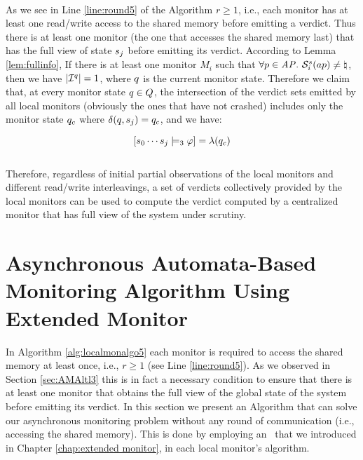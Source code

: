  \ \ 



As we see in Line \ref{line:round5} of the Algorithm $r \geqslant 1$, i.e., each monitor has at least one read/write access to the shared memory before emitting a verdict. Thus there is at least one monitor (the one that accesses the shared memory last) that has the full view of state $s_j$ before emitting its verdict. According to Lemma \ref{lem:fullinfo}, If there is at least one monitor $M_i$ such that $\forall p \in 
\mathit{AP}. ~ \mathcal{S}_i^s(ap) \neq \natural$, then we have $|\mathcal{I}^q| = 1$, where $q$ is the current monitor state. Therefore we claim that, at every monitor state $q \in Q$, the intersection of the verdict sets emitted by all local monitors (obviously the ones that have not crashed) includes only the monitor state $q_c$ where $\delta(q, s_j) = q_c$, and we have:

$$[s_0 \cdots s_j \models_3 \varphi] = \lambda (q_c)$$  \\ 

Therefore, regardless of initial partial observations of the local monitors and different read/write interleavings, a set of verdicts collectively provided by the local monitors can be used to compute the verdict computed by a centralized monitor that has full view of the system under scrutiny.



\section{Asynchronous Automata-Based Monitoring Algorithm Using Extended \LTLtri Monitor}
\label{sec:AMAExltl}


In Algorithm \ref{alg:localmonalgo5} each monitor is required to access the shared memory at least once, i.e., $r \geqslant 1$ (see Line \ref{line:round5}). As we observed in Section \ref{sec:AMAltl3} this is in fact a necessary condition to ensure that there is at least one monitor that obtains the full view of the global state of the system before emitting its verdict. In this section we present an Algorithm that can solve our asynchronous monitoring problem without any round of communication (i.e., accessing the shared memory). This is done by employing an \Exltl~that we introduced in Chapter \ref{chap:extended monitor}, in each local monitor's algorithm. \\


